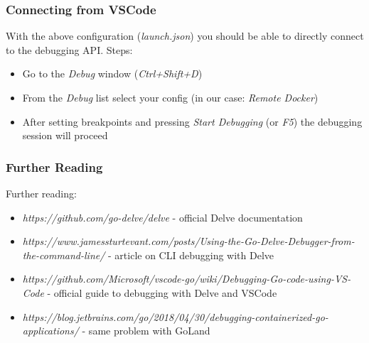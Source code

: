 \documentclass[pdf,xcolor=dvipsnames,noparindent]{beamer}
\begin{document}
\begin{frame}
	\frametitle{Connecting from VSCode}
	With the above configuration (\emph{launch.json}) you should be able
	to directly connect to the debugging API.
	\pause
	\newline
	\newline
	Steps:
	\pause
	\begin{itemize}
		\item Go to the \emph{Debug} window (\emph{Ctrl+Shift+D})
		      \pause
		\item From the \emph{Debug} list select your config (in our case: \emph{Remote Docker})
		      \pause
		\item After setting breakpoints and pressing \emph{Start Debugging} (or \emph{F5}) the debugging session will proceed
	\end{itemize}
\end{frame}

\begin{frame}
	\frametitle{Further Reading}
	Further reading:
	\begin{itemize}
		\item \emph{https://github.com/go-delve/delve} - official Delve documentation
		\item \emph{https://www.jamessturtevant.com/posts/Using-the-Go-Delve-Debugger-from-the-command-line/} - article on CLI debugging with Delve
		\item \emph{https://github.com/Microsoft/vscode-go/wiki/Debugging-Go-code-using-VS-Code} - official guide to debugging with Delve and VSCode
		\item \emph{https://blog.jetbrains.com/go/2018/04/30/debugging-containerized-go-applications/} - same problem with GoLand
	\end{itemize}
\end{frame}

\end{document}
